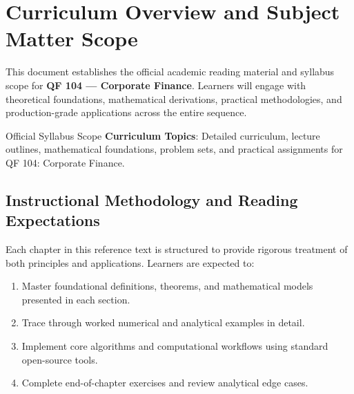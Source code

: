 \section{Curriculum Overview and Subject Matter Scope}

This document establishes the official academic reading material and syllabus scope for \textbf{QF 104 --- Corporate Finance}. Learners will engage with theoretical foundations, mathematical derivations, practical methodologies, and production-grade applications across the entire sequence.

\begin{InsightBox}{Official Syllabus Scope}
  \textbf{Curriculum Topics}: Detailed curriculum, lecture outlines, mathematical foundations, problem sets, and practical assignments for QF 104: Corporate Finance.
\end{InsightBox}

\subsection{Instructional Methodology and Reading Expectations}

Each chapter in this reference text is structured to provide rigorous treatment of both principles and applications. Learners are expected to:
\begin{enumerate}
  \item Master foundational definitions, theorems, and mathematical models presented in each section.
  \item Trace through worked numerical and analytical examples in detail.
  \item Implement core algorithms and computational workflows using standard open-source tools.
  \item Complete end-of-chapter exercises and review analytical edge cases.
\end{enumerate}


